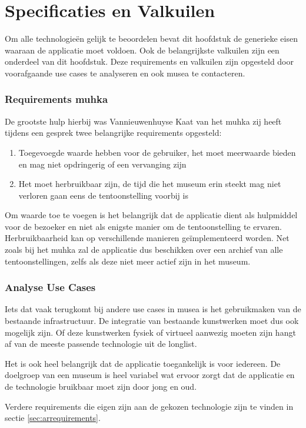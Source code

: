 \chapter{Specificaties en Valkuilen}
\label{ch:requirements}

Om alle technologieën gelijk te beoordelen bevat dit hoofdstuk de generieke eisen waaraan de applicatie moet voldoen. Ook de belangrijkste valkuilen zijn een onderdeel van dit hoofdstuk. Deze requirements en valkuilen zijn opgesteld door voorafgaande use cases te analyseren en ook musea te contacteren. 


\subsection{Requirements \acrshort{muhka}}
De grootste hulp hierbij was Vannieuwenhuyse Kaat van het \acrlong{muhka} zij heeft tijdens een gesprek twee belangrijke requirements opgesteld: 

\begin{enumerate}
    \item Toegevoegde waarde hebben voor de gebruiker, het moet meerwaarde bieden en mag niet opdringerig of een vervanging zijn 
    \item Het moet herbruikbaar zijn, de tijd die het museum erin steekt mag niet verloren gaan eens de tentoonstelling voorbij is 
\end{enumerate}

Om waarde toe te voegen is het belangrijk dat de applicatie dient als hulpmiddel voor de bezoeker en niet als enigste manier om de tentoonstelling te ervaren. Herbruikbaarheid kan op verschillende manieren geïmplementeerd worden. Net zoals bij het \acrshort{muhka} zal de applicatie dus beschikken over een archief van alle tentoonstellingen, zelfs als deze niet meer actief zijn in het museum. 

\subsection{Analyse Use Cases}
Iets dat vaak terugkomt bij andere use cases in musea is het gebruikmaken van de bestaande infrastructuur. De integratie van bestaande kunstwerken moet dus ook mogelijk zijn. Of deze kunstwerken fysiek of virtueel aanwezig moeten zijn hangt af van de meeste passende technologie uit de longlist.

Het is ook heel belangrijk dat de applicatie toegankelijk is voor iedereen. De doelgroep van een museum is heel variabel wat ervoor zorgt dat de applicatie en de technologie bruikbaar moet zijn door jong en oud.

Verdere requirements die eigen zijn aan de gekozen technologie zijn te vinden in sectie \ref{sec:arrequirements}.